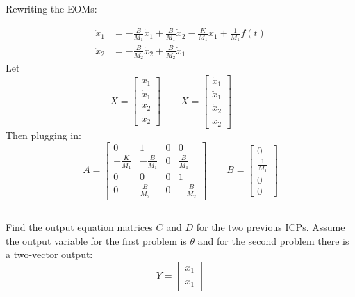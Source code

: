 \documentclass{article}	%
\begin{document}
\begin{solution}
Rewriting the EOMs:

\begin{align*}
\ddot{x}_1 &= -\frac{B}{M_1}\dot{x}_1 +\frac{B}{M_1}\dot{x}_2 -\frac{K}{M_1}{x}_1 + \frac{1}{M_1}f(t)  \\
\ddot{x}_2 &= -\frac{B}{M_2}\dot{x}_2 +\frac{B}{M_2}\dot{x}_1
\end{align*}
Let
\[
X       = \begin{bmatrix}x_1\\\dot{x}_1\\x_2\\\dot{x}_2\end{bmatrix} \qquad
\dot{X} = \begin{bmatrix}\dot{x}_1\\\ddot{x}_1\\\dot{x}_2\\\ddot{x}_2\end{bmatrix} \qquad
\]
Then plugging in:
\[
A = \begin{bmatrix}0&1&0&0\\
-\frac{K}{M_1} &-\frac{B}{M_1} & 0  &\frac{B}{M_1} \\
0&0&0&1\\
0 &\frac{B}{M_2} & 0 &-\frac{B}{M_2}
\end{bmatrix}
\qquad  B =
\begin{bmatrix}0 \\ \frac{1}{M_1}\\ 0 \\ 0\end{bmatrix}
\]

\end{solution}


\subsection{}
Find the output equation matrices $C$ and $D$ for the two previous ICPs.  Assume the output variable
for the first problem is $\theta$ and for the second problem there is a two-vector output:
\[
Y = \begin{bmatrix}x_1\\\dot{x}_1\end{bmatrix}
\]
\end{document}
